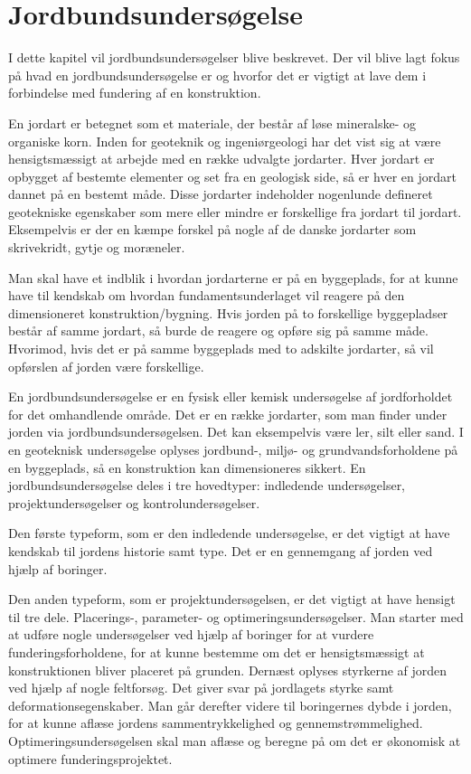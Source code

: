 \chapter{Jordbundsundersøgelse}
I dette kapitel vil jordbundsundersøgelser blive beskrevet. Der vil blive lagt fokus på hvad en jordbundsundersøgelse er og hvorfor det er vigtigt at lave dem i forbindelse med fundering af en konstruktion.

En jordart er betegnet som et materiale, der består af løse mineralske- og organiske korn. Inden for geoteknik og ingeniørgeologi har det vist sig at være hensigtsmæssigt at arbejde med en række udvalgte jordarter. Hver jordart er opbygget af bestemte elementer og set fra en geologisk side, så er hver en jordart dannet på en bestemt måde. Disse jordarter indeholder nogenlunde defineret geotekniske egenskaber som mere eller mindre er forskellige fra jordart til jordart. Eksempelvis er der en kæmpe forskel på nogle af de danske jordarter som skrivekridt, gytje og moræneler. 

Man skal have et indblik i hvordan jordarterne er på en byggeplads, for at kunne have til kendskab om hvordan fundamentsunderlaget vil reagere på den dimensioneret konstruktion/bygning. Hvis jorden på to forskellige byggepladser består af samme jordart, så burde de reagere og opføre sig på samme måde. Hvorimod, hvis det er på samme byggeplads med to adskilte jordarter, så vil opførslen af jorden være forskellige. 

En jordbundsundersøgelse er en fysisk eller kemisk undersøgelse af jordforholdet for det omhandlende område. Det er en række jordarter, som man finder under jorden via jordbundsundersøgelsen. Det kan eksempelvis være ler, silt eller sand. I en geoteknisk undersøgelse oplyses jordbund-, miljø- og grundvandsforholdene på en byggeplads, så en konstruktion kan dimensioneres sikkert. En jordbundsundersøgelse deles i tre hovedtyper: indledende undersøgelser, projektundersøgelser og kontrolundersøgelser. 

Den første typeform, som er den indledende undersøgelse, er det vigtigt at have kendskab til jordens historie samt type. Det er en gennemgang af jorden ved hjælp af boringer. 

Den anden typeform, som er projektundersøgelsen, er det vigtigt at have hensigt til tre dele. Placerings-, parameter- og optimeringsundersøgelser. Man starter med at udføre nogle undersøgelser ved hjælp af boringer for at vurdere funderingsforholdene, for at kunne bestemme om det er hensigtsmæssigt at konstruktionen bliver placeret på grunden. Dernæst oplyses styrkerne af jorden ved hjælp af nogle feltforsøg. Det giver svar på jordlagets styrke samt deformationsegenskaber. Man går derefter videre til boringernes dybde i jorden, for at kunne aflæse jordens sammentrykkelighed og gennemstrømmelighed. Optimeringsundersøgelsen skal man aflæse og beregne på om det er økonomisk at optimere funderingsprojektet. 


